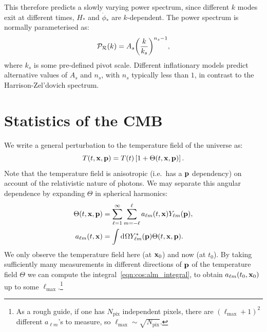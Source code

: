 This therefore predicts a slowly varying power spectrum, since different \(k\) modes exit at different times, \(H_*\) and \(\dot{\phi}_*\) are \(k\)-dependent. The power spectrum is normally parameterised as:
\begin{equation}
  \mathcal{P}_{\mathcal{R}}(k) = A_s {\left( \frac{k}{k_s} \right)}^{n_s-1},
  \label{eqn:cos:lcdm_power}
\end{equation}
where \(k_s\) is some pre-defined pivot scale.
Different inflationary models predict alternative values of \(A_s\) and \(n_s\), with \(n_s\) typically less than \(1\), in contrast to the Harrison-Zel'dovich spectrum.








\section{Statistics of the CMB}
\label{cos:sec:CMB_stats}
We write a general perturbation to the temperature field of the universe as:
\begin{equation}
  T(t,\mathbf{x},\mathbf{p}) = T(t)\left[ 1+\Theta(t,\mathbf{x},\mathbf{p}) \right].
\end{equation}
Note that the temperature field is anisotropic (i.e.\ has a \(\mathbf{p}\) dependency) on account of the relativistic nature of photons. We may separate this angular dependence by expanding \(\Theta\) in spherical harmonics:
\begin{align}
  \Theta(t,\mathbf{x},\mathbf{p}) &= \sum_{\ell=1}^{\infty}\sum_{m=-\ell}^{\ell}a_{\ell m}(t,\mathbf{x}) Y_{\ell m}(\mathbf{p}),\\
  a_{\ell m}(t,\mathbf{x}) &= \int \operatorname{d}^{}\!{\Omega} Y_{\ell m}^\ast(\mathbf{p}) \Theta(t,\mathbf{x},\mathbf{p}).
  \label{eqn:cos:alm_integral}
\end{align}
We only observe the temperature field here (at \(\mathbf{x}_0\)) and now (at \(t_0\)). By taking sufficiently many measurements in different directions of \(\mathbf{p}\) of the temperature field \(\Theta\) we can compute the integral~\eqref{eqn:cos:alm_integral}, to obtain \(a_{\ell m}(t_0,\mathbf{x}_0)\) up to some \(\ell_{\max{}}\).\footnote{As a rough guide, if one has \(N_\mathrm{pix}\) independent pixels, there are \({(\ell_{\max{}}+1)}^2\) different \(a_{\ell m}\)'s to measure, so \(\ell_{\max{}} \sim \sqrt{N_\mathrm{pix}}\).}

